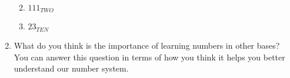 \documentclass{article}
\begin{document}
\begin{enumerate}
\begin{enumerate}
\vspace{0.5in}

\item $111_{TWO}$

\vspace{0.5in}

\item $23_{TEN}$
\end{enumerate}

\newpage

\item What do you think is the importance of learning numbers in other bases? You can answer this question in terms of how you think it helps you better understand our number system.

\end{enumerate}
\end{document}
